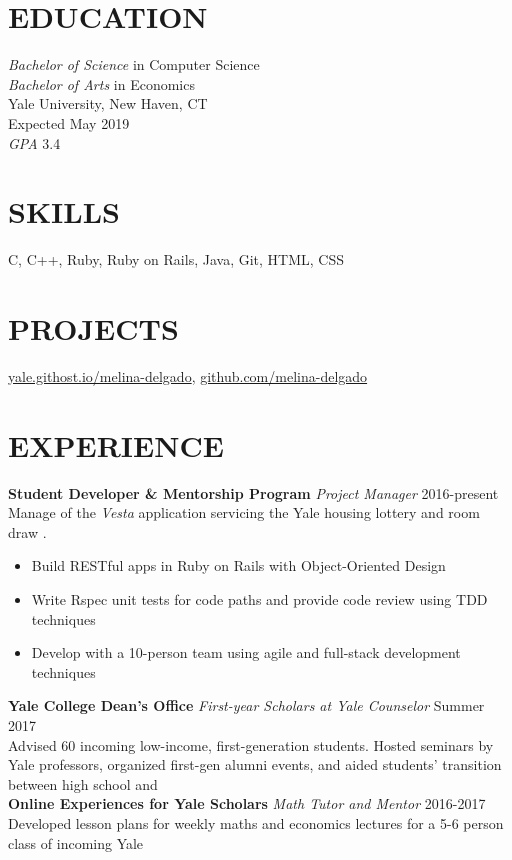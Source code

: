 \documentclass[margin, centered]{res}
\begin{document}
\address{130 Prospect St | New Haven, CT 06511 | (954) 682-8999 | melina.delgado@yale.edu}

\begin{resume}
  \section{EDUCATION}
  \textit{Bachelor of Science} in Computer Science \\
  \textit{Bachelor of Arts} in Economics \\
  Yale University, New Haven, CT \\
  Expected May 2019 \\
  \textit{GPA} 3.4

  \section{SKILLS}
  C, C++, Ruby, Ruby on Rails, Java, Git, HTML, CSS
  
  \section{PROJECTS}
  \href{http://yale.githost.io/melina-delgado}{yale.githost.io/melina-delgado},  
  \href{http://github.com/melina-delgado}{github.com/melina-delgado}

  \section{EXPERIENCE}
  \textbf{Student Developer \&  Mentorship Program} \textit{Project Manager} \hfill 2016-present \\
  Manage of the \textit{Vesta} application servicing the Yale housing lottery and room draw . 
  \begin{itemize}
    \item Build RESTful apps in Ruby on Rails with Object-Oriented Design
    \item Write Rspec unit tests for code paths and provide code review using TDD techniques
    \item Develop with a 10-person team using agile and full-stack development techniques
  \end{itemize}
  \textbf{Yale College Dean's Office} \textit{First-year Scholars at Yale Counselor} \hfill Summer 2017 \\
  Advised 60 incoming low-income, first-generation students. Hosted seminars by Yale professors, organized first-gen alumni events, and aided students' transition between high school and  \\
  \textbf{Online Experiences for Yale Scholars} \textit{Math Tutor and Mentor} \hfill 2016-2017 \\
  Developed lesson plans for weekly maths and economics lectures for a 5-6 person class of incoming Yale 


\end{resume}
\end{document}
